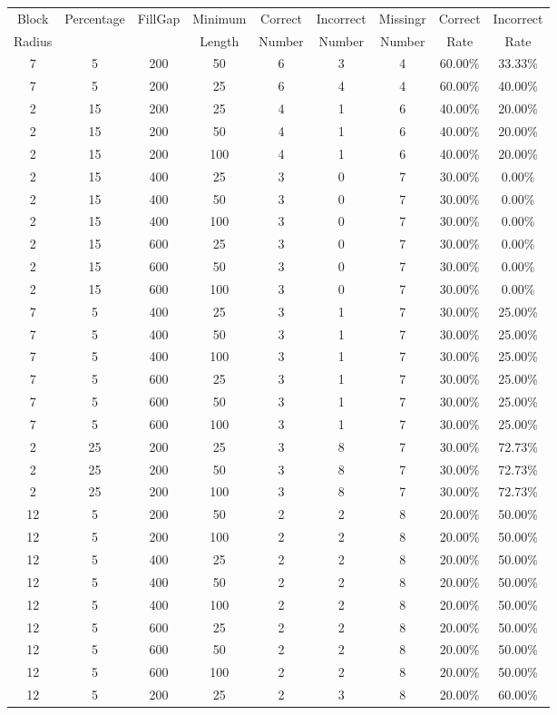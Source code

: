 \clearpage
\begingroup
\setlength{\LTleft}{-20cm plus -1fill}
\setlength{\LTright}{\LTleft}
{\small
\begin{longtable}{| c | c | c | c | c | c | c | c | c |} \hline
Block & Percentage & FillGap & Minimum & Correct & Incorrect & Missingr & Correct & Incorrect \\
Radius &  & & Length & Number & Number & Number & Rate & Rate \\ \hline
7&5&200&50&6&3&4&60.00\%&33.33\%\\
7&5&200&25&6&4&4&60.00\%&40.00\%\\
2&15&200&25&4&1&6&40.00\%&20.00\%\\
2&15&200&50&4&1&6&40.00\%&20.00\%\\
2&15&200&100&4&1&6&40.00\%&20.00\%\\
2&15&400&25&3&0&7&30.00\%&0.00\%\\
2&15&400&50&3&0&7&30.00\%&0.00\%\\
2&15&400&100&3&0&7&30.00\%&0.00\%\\
2&15&600&25&3&0&7&30.00\%&0.00\%\\
2&15&600&50&3&0&7&30.00\%&0.00\%\\
2&15&600&100&3&0&7&30.00\%&0.00\%\\
7&5&400&25&3&1&7&30.00\%&25.00\%\\
7&5&400&50&3&1&7&30.00\%&25.00\%\\
7&5&400&100&3&1&7&30.00\%&25.00\%\\
7&5&600&25&3&1&7&30.00\%&25.00\%\\
7&5&600&50&3&1&7&30.00\%&25.00\%\\
7&5&600&100&3&1&7&30.00\%&25.00\%\\
2&25&200&25&3&8&7&30.00\%&72.73\%\\
2&25&200&50&3&8&7&30.00\%&72.73\%\\
2&25&200&100&3&8&7&30.00\%&72.73\%\\
12&5&200&50&2&2&8&20.00\%&50.00\%\\
12&5&200&100&2&2&8&20.00\%&50.00\%\\
12&5&400&25&2&2&8&20.00\%&50.00\%\\
12&5&400&50&2&2&8&20.00\%&50.00\%\\
12&5&400&100&2&2&8&20.00\%&50.00\%\\
12&5&600&25&2&2&8&20.00\%&50.00\%\\
12&5&600&50&2&2&8&20.00\%&50.00\%\\
12&5&600&100&2&2&8&20.00\%&50.00\%\\
12&5&200&25&2&3&8&20.00\%&60.00\%\\

\end{longtable}}
